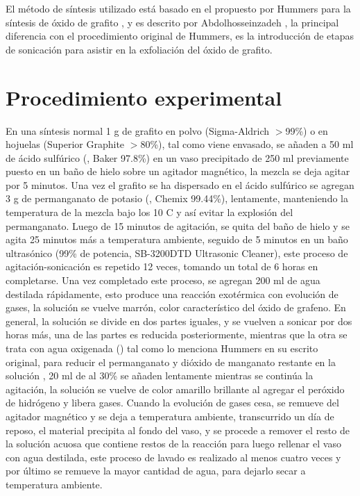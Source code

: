 El método de síntesis utilizado está basado en el propuesto por Hummers para la síntesis de óxido de grafito \citep{Hummers1958}, y es descrito por Abdolhosseinzadeh \citep{Abdolhosseinzadeh2015}, la principal diferencia con el procedimiento original de Hummers, es la introducción de etapas de sonicación para asistir en la exfoliación del óxido de grafito.

\section{Procedimiento experimental}
En una síntesis normal 1 g de grafito en polvo (Sigma-Aldrich $>$99\%) o en hojuelas (Superior Graphite $>$80\%), tal como viene envasado, se añaden a 50 ml de ácido sulfúrico (, Baker 97.8\%) en un vaso precipitado de 250 ml previamente puesto en un baño de hielo sobre un agitador magnético, la mezcla se deja agitar por 5 minutos. Una vez el grafito se ha dispersado en el ácido sulfúrico se agregan 3 g de permanganato de potasio (, Chemix 99.44\%), lentamente, manteniendo la temperatura de la mezcla bajo los 10 C y así evitar la explosión del permanganato. Luego de 15 minutos de agitación, se quita del baño de hielo y se agita 25 minutos más a temperatura ambiente, seguido de 5 minutos en un baño ultrasónico (99\% de potencia, SB-3200DTD Ultrasonic Cleaner), este proceso de agitación-sonicación es repetido 12 veces, tomando un total de 6 horas en completarse. Una vez completado este proceso, se agregan 200 ml de agua destilada rápidamente, esto produce una reacción exotérmica con evolución de gases, la solución se vuelve marrón, color característico del óxido de grafeno. En general, la solución se divide en dos partes iguales, y se vuelven a sonicar por dos horas más, una de las partes es reducida posteriormente, mientras que la otra se trata con agua oxigenada () tal como lo menciona Hummers en su escrito original, para reducir el permanganato y dióxido de manganato restante en la solución \citep{Hummers1958}, 20 ml de  al 30\% se añaden lentamente mientras se continúa la  agitación, la solución se vuelve de color amarillo brillante al agregar el peróxido de hidrógeno y libera gases. Cuando la evolución de gases cesa, se remueve del agitador magnético y se deja a temperatura ambiente, transcurrido un día de reposo, el material precipita al fondo del vaso, y se procede a remover el resto de la solución acuosa que contiene restos de la reacción para luego rellenar el vaso con agua destilada, este proceso de lavado es realizado al menos cuatro veces y por último se remueve la mayor cantidad de agua, para dejarlo secar a temperatura ambiente.

